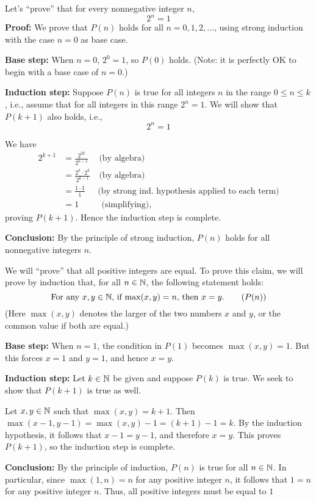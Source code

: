 \begin{example}\label{example:induction:fall4} Let's ``prove'' that for every nonnegative integer $n$, 
\[
\tag{$P(n)$} 2^n=1
\]
\textbf{Proof:} We prove that $P(n)$ holds for all $n=0,1,2,\dots$, using
strong induction with the case $n=0$ as base case.

\textbf{Base step:} When $n=0$, $2^0=1$, so $P(0)$ holds. (Note: it is perfectly OK to begin with a base case of $n=0$.)

\textbf{Induction step:} 
Suppose $P(n)$ is true for all integers $n$ in the range $0\le n\le k$, i.e.,
assume that for all integers in this range $2^n=1$.
We will show that $P(k+1)$ also holds, i.e., 
\[
\tag{$P(k+1)$} 2^n=1
\]

We have
\begin{align*}
2^{k+1}&=\frac{2^{2k}}{2^{k-1}}
\quad~\text{(by algebra)}
\\
&=\frac{2^k\cdot 2^k}{2^{k-1}}
\quad\text{(by algebra)}
\\
&=\frac{1\cdot 1}{1}
\quad~~\text{(by strong ind. hypothesis applied to each term)}
\\
&=1
\qquad~~~\text{(simplifying),}
\end{align*}
proving $P(k+1)$. Hence the induction step is complete.

\textbf{Conclusion:} By the principle of strong induction, $P(n)$ holds for all
nonnegative integers $n$.
\end{example}


\begin{example}\label{example:induction:fall5}
We will ``prove'' that all positive integers are equal. To prove this claim, we will prove by induction that, for all $n\in\mathbb{N}$,
the following statement holds:
\[
\text{For any $x,y\in\mathbb{N}$, if $\max(x,y)=n$, then $x=y$.}
\tag{$P(n)$}
\]
(Here $\max(x,y)$ denotes the larger of the two numbers $x$ and $y$, or the
common value if both are equal.)

\textbf{Base step:} When $n=1$,
the condition in $P(1)$ becomes $\max(x,y)=1$. But this forces
$x=1$ and $y=1$, and hence $x=y$. 

\textbf{Induction step:} 
Let $k\in\mathbb{N}$ be given and suppose $P(k)$ is true.  We seek to show that
$P(k+1)$ is true as well.

Let $x,y\in\mathbb{N}$ such that $\max(x,y)=k+1$. Then
$\max(x-1,y-1)=\max(x,y)-1=(k+1)-1=k$. By the induction hypothesis, it follows
that $x-1=y-1$, and therefore  $x=y$. This proves $P(k+1)$, so the induction
step is complete.

\textbf{Conclusion:} By the principle of induction, 
$P(n)$  is true for all $n\in\mathbb{N}$. In particular, since $\max(1,n)=n$ for any
positive integer $n$, it follows that $1=n$ for any positive integer $n$. 
Thus, all positive integers must be equal to $1$
\end{example}

